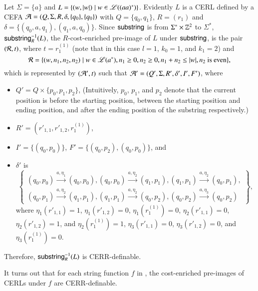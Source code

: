 \begin{example}[$\substring^{-1}_R(L)$]\label{exm:pre-image}
Let $\Sigma = \{a\}$ and $L = \{(w, |w|) \mid w \in \mathscr{L}((aa)^*) \}$. Evidently $L$  is a CERL defined by a CEFA $\mathcal{A} = (Q, \Sigma, R, \delta, \{q_0\}, \{q_0\})$ with $Q=\{q_0,q_1\}$, $R=(r_1)$ and $\delta = \{(q_0, a, q_1), (q_1, a, q_0)\}$. Since $\mathsf{substring}$  is  from $\Sigma^* \times \mathbb{Z}^2$ to $\Sigma^*$, $\substring^{-1}_R(L)$, the $R$-cost-enriched pre-image of $L$ under $\mathsf{substring}$, is the pair $(\mathcal{R}, t)$, where $t=r^{(1)}_1$ (note that in this case $l=1$, $k_0=1$, and $k_1=2$) and 
%
$$\mathcal{R} = \{(w, n_1, n_2, n_2) \mid w \in \mathscr{L}(a^*), n_1 \ge 0, n_2 \ge 0, n_1+n_2 \le |w|, n_2 \mbox{ is even}\},$$ 
%
which is represented by $(\mathcal{A}', t)$ such that $\mathcal{A}'= (Q', \Sigma, R', \delta', I', F')$, where 
\begin{itemize}
\item $Q' = Q \times \{p_0, p_1, p_2\}$, (Intuitively, $p_0$, $p_1$, and $p_2$ denote that the current position is before the starting position, between the starting position and ending position, and after the ending position of the substring respectively.) 
\item $R'= \left(r'_{1,1}, r'_{1,2}, r^{(1)}_1 \right)$, 
\item $I' =\{(q_0,p_0)\}$, $F'=\{(q_0, p_2), (q_0, p_0)\}$, and 
\item $\delta'$ is  
\[
\left\{
\begin{array}{l}
(q_0, p_0) \xrightarrow{a, \eta_1} (q_0, p_0), (q_0, p_0) \xrightarrow{a, \eta_2} (q_1, p_1), (q_1, p_1) \xrightarrow{a, \eta_2} (q_0, p_1), \\
(q_0, p_1) \xrightarrow{a, \eta_2} (q_1, p_1), (q_1, p_1) \xrightarrow{a, \eta_2} (q_0, p_2), (q_0, p_2) \xrightarrow{a, \eta_3} (q_0, p_2)
\end{array}
\right\},
\] 
where $\eta_1(r'_{1,1})=1$, $\eta_1(r'_{1,2})=0$, $\eta_1(r^{(1)}_1)=0$, $\eta_2(r'_{1,1})=0$, $\eta_2(r'_{1,2})=1$, and $\eta_2(r^{(1)}_1)=1$, $\eta_3(r'_{1,1})=0$, $\eta_3(r'_{1,2})=0$, and $\eta_3(r^{(1)}_1)=0$.
\end{itemize}
%
Therefore, $\substring^{-1}_R(L)$ is CERR-definable.
\end{example}


It turns out that for each string function $f$ in {\slint}, the cost-enriched pre-images of CERLs under $f$ are CERR-definable.

